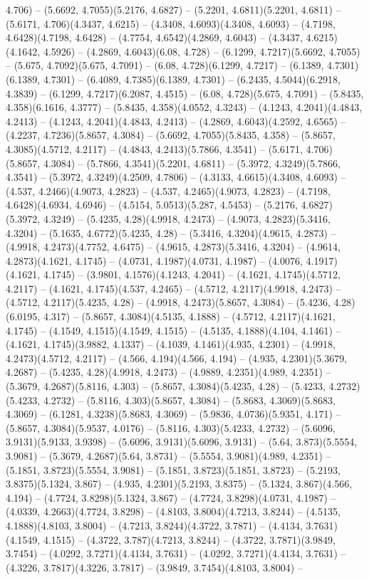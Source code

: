 4.706) -- (5.6692, 4.7055)(5.2176, 4.6827) -- (5.2201, 4.6811)(5.2201, 4.6811) -- (5.6171, 4.706)(4.3437, 4.6215) -- (4.3408, 4.6093)(4.3408, 4.6093) -- (4.7198, 4.6428)(4.7198, 4.6428) -- (4.7754, 4.6542)(4.2869, 4.6043) -- (4.3437, 4.6215)(4.1642, 4.5926) -- (4.2869, 4.6043)(6.08, 4.728) -- (6.1299, 4.7217)(5.6692, 4.7055) -- (5.675, 4.7092)(5.675, 4.7091) -- (6.08, 4.728)(6.1299, 4.7217) -- (6.1389, 4.7301)(6.1389, 4.7301) -- (6.4089, 4.7385)(6.1389, 4.7301) -- (6.2435, 4.5044)(6.2918, 4.3839) -- (6.1299, 4.7217)(6.2087, 4.4515) -- (6.08, 4.728)(5.675, 4.7091) -- (5.8435, 4.358)(6.1616, 4.3777) -- (5.8435, 4.358)(4.0552, 4.3243) -- (4.1243, 4.2041)(4.4843, 4.2413) -- (4.1243, 4.2041)(4.4843, 4.2413) -- (4.2869, 4.6043)(4.2592, 4.6565) -- (4.2237, 4.7236)(5.8657, 4.3084) -- (5.6692, 4.7055)(5.8435, 4.358) -- (5.8657, 4.3085)(4.5712, 4.2117) -- (4.4843, 4.2413)(5.7866, 4.3541) -- (5.6171, 4.706)(5.8657, 4.3084) -- (5.7866, 4.3541)(5.2201, 4.6811) -- (5.3972, 4.3249)(5.7866, 4.3541) -- (5.3972, 4.3249)(4.2509, 4.7806) -- (4.3133, 4.6615)(4.3408, 4.6093) -- (4.537, 4.2466)(4.9073, 4.2823) -- (4.537, 4.2465)(4.9073, 4.2823) -- (4.7198, 4.6428)(4.6934, 4.6946) -- (4.5154, 5.0513)(5.287, 4.5453) -- (5.2176, 4.6827)(5.3972, 4.3249) -- (5.4235, 4.28)(4.9918, 4.2473) -- (4.9073, 4.2823)(5.3416, 4.3204) -- (5.1635, 4.6772)(5.4235, 4.28) -- (5.3416, 4.3204)(4.9615, 4.2873) -- (4.9918, 4.2473)(4.7752, 4.6475) -- (4.9615, 4.2873)(5.3416, 4.3204) -- (4.9614, 4.2873)(4.1621, 4.1745) -- (4.0731, 4.1987)(4.0731, 4.1987) -- (4.0076, 4.1917)(4.1621, 4.1745) -- (3.9801, 4.1576)(4.1243, 4.2041) -- (4.1621, 4.1745)(4.5712, 4.2117) -- (4.1621, 4.1745)(4.537, 4.2465) -- (4.5712, 4.2117)(4.9918, 4.2473) -- (4.5712, 4.2117)(5.4235, 4.28) -- (4.9918, 4.2473)(5.8657, 4.3084) -- (5.4236, 4.28)(6.0195, 4.317) -- (5.8657, 4.3084)(4.5135, 4.1888) -- (4.5712, 4.2117)(4.1621, 4.1745) -- (4.1549, 4.1515)(4.1549, 4.1515) -- (4.5135, 4.1888)(4.104, 4.1461) -- (4.1621, 4.1745)(3.9882, 4.1337) -- (4.1039, 4.1461)(4.935, 4.2301) -- (4.9918, 4.2473)(4.5712, 4.2117) -- (4.566, 4.194)(4.566, 4.194) -- (4.935, 4.2301)(5.3679, 4.2687) -- (5.4235, 4.28)(4.9918, 4.2473) -- (4.9889, 4.2351)(4.989, 4.2351) -- (5.3679, 4.2687)(5.8116, 4.303) -- (5.8657, 4.3084)(5.4235, 4.28) -- (5.4233, 4.2732)(5.4233, 4.2732) -- (5.8116, 4.303)(5.8657, 4.3084) -- (5.8683, 4.3069)(5.8683, 4.3069) -- (6.1281, 4.3238)(5.8683, 4.3069) -- (5.9836, 4.0736)(5.9351, 4.171) -- (5.8657, 4.3084)(5.9537, 4.0176) -- (5.8116, 4.303)(5.4233, 4.2732) -- (5.6096, 3.9131)(5.9133, 3.9398) -- (5.6096, 3.9131)(5.6096, 3.9131) -- (5.64, 3.873)(5.5554, 3.9081) -- (5.3679, 4.2687)(5.64, 3.8731) -- (5.5554, 3.9081)(4.989, 4.2351) -- (5.1851, 3.8723)(5.5554, 3.9081) -- (5.1851, 3.8723)(5.1851, 3.8723) -- (5.2193, 3.8375)(5.1324, 3.867) -- (4.935, 4.2301)(5.2193, 3.8375) -- (5.1324, 3.867)(4.566, 4.194) -- (4.7724, 3.8298)(5.1324, 3.867) -- (4.7724, 3.8298)(4.0731, 4.1987) -- (4.0339, 4.2663)(4.7724, 3.8298) -- (4.8103, 3.8004)(4.7213, 3.8244) -- (4.5135, 4.1888)(4.8103, 3.8004) -- (4.7213, 3.8244)(4.3722, 3.7871) -- (4.4134, 3.7631)(4.1549, 4.1515) -- (4.3722, 3.787)(4.7213, 3.8244) -- (4.3722, 3.7871)(3.9849, 3.7454) -- (4.0292, 3.7271)(4.4134, 3.7631) -- (4.0292, 3.7271)(4.4134, 3.7631) -- (4.3226, 3.7817)(4.3226, 3.7817) -- (3.9849, 3.7454)(4.8103, 3.8004) -- 